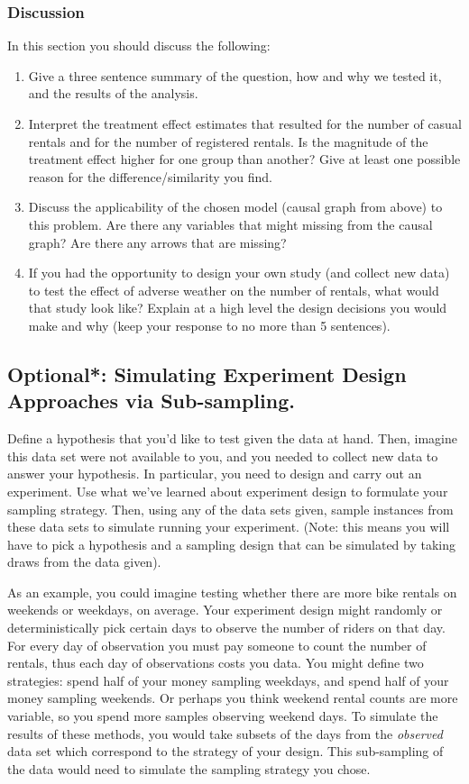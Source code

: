 \documentclass[12pt, answers, addpoints]{exam}
\begin{document}
\subsubsection{Discussion}
In this section you should discuss the following:
\begin{enumerate}
    \item Give a three sentence summary of the question, how and why we tested it, and the results of the analysis.
    \item Interpret the treatment effect estimates that resulted for the number of casual rentals and for the number of registered rentals. Is the magnitude of the treatment effect higher for one group than another? Give at least one possible reason for the difference/similarity you find.
    \item Discuss the applicability of the chosen model (causal graph from above) to this problem. Are there any variables that might missing from the causal graph? Are there any arrows that are missing?
    \item If you had the opportunity to design your own study (and collect new data) to test the effect of adverse weather on the number of rentals, what would that study look like? Explain at a high level the design decisions you would make and why (keep your response to no more than 5 sentences).
\end{enumerate}


\subsection{Optional*: Simulating Experiment Design Approaches via Sub-sampling.}

Define a hypothesis that you'd like to test given the data at hand. Then, imagine this data set were not available to you, and you needed to collect new data to answer your hypothesis. In particular, you need to design and carry out an experiment. Use what we've learned about experiment design to formulate your sampling strategy. Then, using any of the data sets given, sample instances from these data sets to simulate running your experiment. (Note: this means you will have to pick a hypothesis and a sampling design that can be simulated by taking draws from the data given). 

As an example, you could imagine testing whether there are more bike rentals on weekends or weekdays, on average. Your experiment design might randomly or deterministically pick certain days to observe the number of riders on that day. For every day of observation you must pay someone to count the number of rentals, thus each day of observations costs you data.  You might define two strategies: spend half of your money sampling weekdays, and spend half of your money sampling weekends. Or perhaps you think weekend rental counts are more variable, so you spend more samples observing weekend days.
To simulate the results of these methods, you would take subsets of the days from the \emph{observed} data set which correspond to the strategy of your design. This sub-sampling of the data would need to simulate the sampling strategy you chose.
\end{document}
